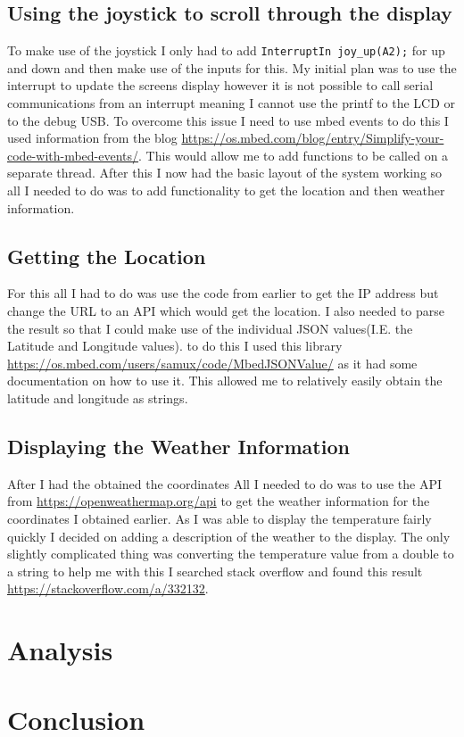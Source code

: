 \documentclass[a4paper,12pt]{scrartcl}
\begin{document}
{		\subsection{Using the joystick to scroll through the display}
		{
			To make use of the joystick I only had to add \lstinline|InterruptIn joy_up(A2);| for up and down and then make use of the inputs for this. My initial plan was to use the interrupt to update the screens display however it is not possible to call serial communications from an interrupt meaning I cannot use the printf to the LCD or to the debug USB. To overcome this issue I need to use mbed events to do this I used information from the blog \url{https://os.mbed.com/blog/entry/Simplify-your-code-with-mbed-events/}\cite{Jongboom2018}. This would allow me to add functions to be called on a separate thread. After this I now had the basic layout of the system working so all I needed to do was to add functionality to get the location and then weather information.
		}
		\subsection{Getting the Location}
		{
			For this all I had to do was use the code from earlier to get the IP address but change the URL to an API which would get the location. I also needed to parse the result so that I could make use of the individual JSON values(I.E. the Latitude and Longitude values). to do this I used this library \url{https://os.mbed.com/users/samux/code/MbedJSONValue/} as it had some documentation on how to use it. This allowed me to relatively easily obtain the latitude and longitude as strings.
		}
		\subsection{Displaying the Weather Information}
		{
			After I had the obtained the coordinates All I needed to do was to use the API from \url{https://openweathermap.org/api} to get the weather information for the coordinates I obtained earlier. As I was able to display the temperature fairly quickly I decided on adding a description of the weather to the display. The  only slightly complicated thing was converting the temperature value from a double to a string to help me with this I searched stack overflow and found this result \url{https://stackoverflow.com/a/332132}\cite{Schaub2008}.
		}
	}
	
	\section{Analysis}
	{
		
	}
	
	\section{Conclusion}
	{
		
	}
	
	\newpage
	
	\printbibliography[heading=bibintoc,title=References]
\end{document}
